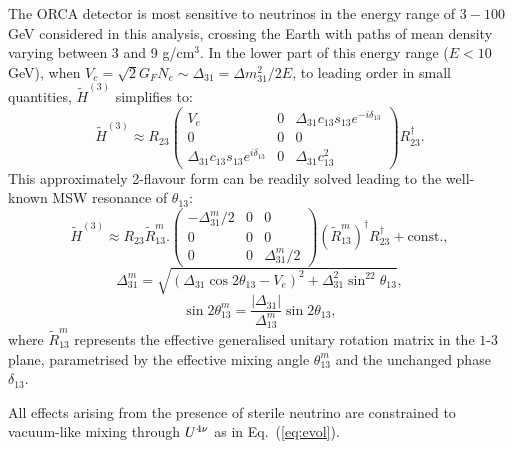 The ORCA detector is most sensitive to neutrinos in the energy range of $3-100$ GeV considered in this analysis, crossing the Earth with paths of mean density varying between 3 and 9 g/cm$^3$. In the lower part of this energy range ($E < 10$ GeV), when $V_e=\sqrt{2}G_FN_e\sim\Delta_{31}=\Delta{m^2_{31}}/2E$, to leading order in small quantities, $\tilde{H}^{(3)}$ simplifies to:
\begin{equation}
    \tilde{H}^{(3)} \approx R_{23} \left(\begin{array}{ccc}
        V_e & 0 & \Delta_{31}c_{13}s_{13}e^{-i\delta_{13}} \\
        0 & 0 & 0 \\
        \Delta_{31}c_{13}s_{13}e^{i\delta_{13}} & 0 & \Delta_{31}c_{13}^2
    \end{array}\right) R_{23}^\dagger .
\end{equation}
This approximately 2-flavour form can be readily solved leading to the well-known MSW resonance of $\theta_{13}$:
\begin{equation}
    \tilde{H}^{(3)} \approx R_{23} \tilde{R}_{13}^m.
    \left(\begin{array}{ccc}
        -\Delta_{31}^m/2 & 0 & 0 \\
        0 & 0 & 0 \\
        0 & 0 & \Delta_{31}^m/2
    \end{array}\right) (\tilde{R}_{13}^m)^\dagger R_{23}^\dagger+\mathrm{const.},
\end{equation}
\begin{equation}
    \Delta_{31}^m = \sqrt{(\Delta_{31}\cos2\theta_{13}-V_e)^2+\Delta_{31}^2\sin^22\theta_{13}},
\end{equation}
\begin{equation}
    \sin2\theta_{13}^m = \frac{|\Delta_{31}|}{\Delta_{13}^m}\sin2\theta_{13},
\end{equation}
\noindent where $\tilde{R}_{13}^m$ represents the effective generalised unitary rotation matrix in the $1\mbox{-}3$ plane, parametrised by the effective mixing angle $\theta_{13}^m$ and the unchanged phase $\delta_{13}$.

All effects arising from the presence of sterile neutrino are constrained to vacuum-like mixing through $U^{4\nu}$ as in Eq.~(\ref{eq:evol}).

